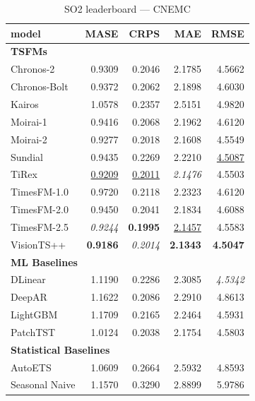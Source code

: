 \begin{table}[H]
\caption{SO2 leaderboard --- CNEMC}
\centering
\begin{small}
\begin{tabular}{lrrrr}
\toprule
model & MASE & CRPS & MAE & RMSE \\
\midrule
\multicolumn{5}{l}{\textbf{TSFMs}} \\
Chronos-2 & 0.9309 & 0.2046 & 2.1785 & 4.5662 \\
Chronos-Bolt & 0.9372 & 0.2062 & 2.1898 & 4.6030 \\
Kairos & 1.0578 & 0.2357 & 2.5151 & 4.9820 \\
Moirai-1 & 0.9416 & 0.2068 & 2.1962 & 4.6120 \\
Moirai-2 & 0.9277 & 0.2018 & 2.1608 & 4.5549 \\
Sundial & 0.9435 & 0.2269 & 2.2210 & \underline{4.5087} \\
TiRex & \underline{0.9209} & \underline{0.2011} & \textit{2.1476} & 4.5503 \\
TimesFM-1.0 & 0.9720 & 0.2118 & 2.2323 & 4.6120 \\
TimesFM-2.0 & 0.9450 & 0.2041 & 2.1834 & 4.6088 \\
TimesFM-2.5 & \textit{0.9244} & \textbf{0.1995} & \underline{2.1457} & 4.5583 \\
VisionTS++ & \textbf{0.9186} & \textit{0.2014} & \textbf{2.1343} & \textbf{4.5047} \\
\midrule
\multicolumn{5}{l}{\textbf{ML Baselines}} \\
DLinear & 1.1190 & 0.2286 & 2.3085 & \textit{4.5342} \\
DeepAR & 1.1622 & 0.2086 & 2.2910 & 4.8613 \\
LightGBM & 1.1709 & 0.2165 & 2.2464 & 4.5931 \\
PatchTST & 1.0124 & 0.2038 & 2.1754 & 4.5803 \\
\midrule
\multicolumn{5}{l}{\textbf{Statistical Baselines}} \\
AutoETS & 1.0609 & 0.2664 & 2.5932 & 4.8593 \\
Seasonal Naive & 1.1570 & 0.3290 & 2.8899 & 5.9786 \\
\bottomrule
\end{tabular}
\end{small}
\end{table}